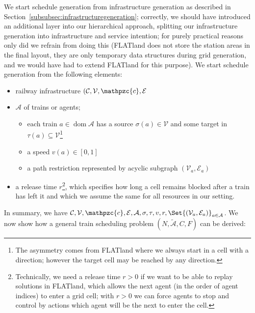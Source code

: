 \documentclass{article}
\DeclareMathOperator{\dom}{dom}
\begin{document}
We start schedule generation from  infrastructure generation as described in Section~\ref{subsubsec:infrastructuregeneration}; correctly, we should have introduced an additional layer into our hierarchical approach, splitting our infrastructure generation into infrastructure and service intention; for purely practical reasons only did we refrain from doing this (FLATland does not store the station areas in the final layout, they are only temporary data structures during grid generation, and we would have had to extend FLATland for this purpose). We start schedule generation from the following elements:
\begin{itemize}
    \item railway infrastructure $(\mathcal{C}, \mathcal{V}, \mathpzc{c}, \mathcal{E}$
    \item $\mathcal{A}$ of trains or agents;
    \begin{itemize}
        \item each train $a\in \dom\mathcal{A}$ has a source $\sigma(a)\in\mathcal{V}$ and some target in $\tau(a)\subseteq\mathcal{V}$\footnote{The asymmetry comes from FLATland where we always start in a cell with a direction; however the target cell may be reached by any direction.}
        \item a speed $v(a) \in [0,1]$
        \item a path restriction represented by acyclic subgraph $(\mathcal{V}_a,\mathcal{E}_a)$
    \end{itemize}

    \item a release time $r$\footnote{Technically, we need a release time $r>0$ if we want to be able to replay solutions in FLATland, which allows the next agent (in the order of agent indices) to enter a grid cell; with $r>0$ we can force agents to stop and control by actions which agent will be the next to enter the cell.}, which specifies how long a cell remains blocked after a train has left it and which we assume the same for all resources in our setting.
\end{itemize}
In summary, we have $\mathcal{C}, \mathcal{V}, \mathpzc{c}, \mathcal{E}, \mathcal{A},\sigma,\tau,v,r,\Set{(\mathcal{V}_a,\mathcal{E}_a)}_{a \in \mathcal{A}}$.
We now show how a general train scheduling problem $(N,\tilde{\mathcal{A}},C,F)$ can be derived:
\end{document}
